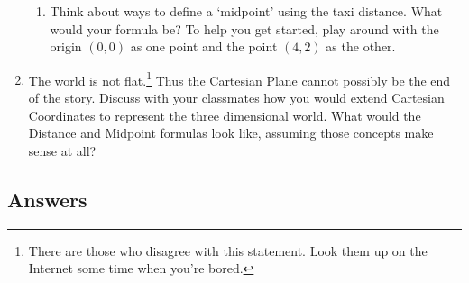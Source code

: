 \documentclass{ximera}
\begin{document}
\begin{enumerate}
\begin{enumerate}
\item Think about ways to define a `midpoint' using the taxi distance.  What would your formula be?  To help you get started, play around with the origin $(0,0)$ as one point and the point $(4,2)$ as the other.

\end{enumerate}


\item \label{orderedtripleexercise} The world is not flat.\footnote{There are those who disagree with this statement.  Look them up on the Internet some time when you're bored.}  Thus the Cartesian Plane cannot possibly be the end of the story.  Discuss with your classmates how you would extend Cartesian Coordinates to represent the three dimensional world.  What would the Distance and Midpoint formulas look like, assuming those concepts make sense at all?

\end{enumerate}


\newpage

\subsection{Answers}
\end{document}
